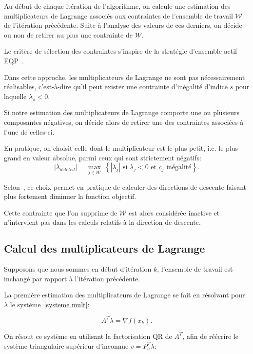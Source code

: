 Au début de chaque itération de l'algorithme, on calcule une estimation des multiplicateurs de Lagrange associés aux contraintes de l'ensemble de travail $\mathcal{W}$ de 
l'itération précédente. Suite à l'analyse des valeurs de ces derniers, on décide ou non de retirer au plus une contrainte de $\mathcal{W}$.

Le critère de sélection des contraintes s'inspire de la stratégie d'ensemble actif EQP~\cite{gillmurray1985}. 

Dans cette approche, les multiplicateurs de Lagrange ne sont pas nécessairement réalisables, c'est-à-dire qu'il peut exister une contrainte d'inégalité d'indice $s$ 
pour laquelle $\lambda_{s}<0$.  

Si notre estimation des multiplicateurs de Lagrange comporte une ou plusieurs composantes négatives, on décide alors de retirer une des contraintes associées à 
l'une de celles-ci. 

En pratique, on choisit celle dont le multiplicateur est le plus petit, i.e. le plus grand en valeur absolue, parmi ceux qui sont strictement négatifs:
\[|\lambda_{deleted}| = \underset{j\in\mathcal{W}}{\max}\ \left\lbrace |\lambda_j| \text{ si }\lambda_j <0 \text{ et }c_j\text{ inégalité}\right\rbrace.\]

Selon~\citet{gillmurray1985}, ce choix permet en pratique de calculer des directions de descente faisant plus fortement diminuer la fonction objectif.

Cette contrainte que l'on supprime de $\mathcal{W}$ est alors considérée inactive et n'intervient pas dans les calculs relatifs à la direction de descente.

\subsection{Calcul des multiplicateurs de Lagrange}

Supposons que nous sommes en début d'itération $k$, l'ensemble de travail est inchangé par rapport à l'itération précédente.

La première estimation des multiplicateurs de Lagrange se fait en résolvant pour $\lambda$ le système~\eqref{systeme mult}:

\begin{equation}\label{systeme mult}
    A^T\lambda = \nabla f(x_k).
\end{equation}

On résout ce système en utilisant la factorisation QR de $A^{T}$, afin de réécrire le système triangulaire supérieur d'inconnue $v = P_{a}^{T}\lambda$:

